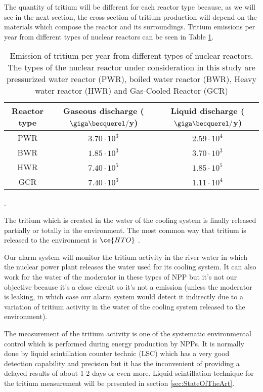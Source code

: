 The quantity of tritium will be different for each reactor type because, as we will see in the next section, the cross section of tritium production will depend on the materials which compose the reactor and its surroundings. Tritium emissions per year from different types of nuclear reactors can be seen in Table \ref{tab:TritiumEmisionsNPPs}. 

\begin{table}[htbp]
\begin{center}
\begin{tabular}{|c|c|c|}
\hline
Reactor type & Gaseous discharge ($\giga\becquerel/$y) & Liquid discharge ($\giga\becquerel/$y) \\
\hline \hline \hline
PWR & $3.70\cdot 10^{3}$ & $2.59\cdot 10^{4}$ \\ \hline
BWR & $1.85\cdot 10^{3}$ & $3.70\cdot 10^{3}$ \\ \hline
HWR & $7.40\cdot 10^{5}$ & $1.85\cdot 10^{5}$ \\ \hline
GCR & $7.40\cdot 10^{3}$ & $1.11\cdot 10^{4}$ \\ \hline
\end{tabular}
\caption{Emission of tritium per year from different types of nuclear reactors. The types of the nuclear reactor under consideration in this study are pressurized water reactor (PWR), boiled water reactor (BWR), Heavy water reactor (HWR) and Gas-Cooled Reactor (GCR) \cite{CommonEmissionTritium}}.
\label{tab:TritiumEmisionsNPPs}
\end{center}
\end{table} 

The tritium which is created in the water of the cooling system is finally released partially or totally in the environment. The most common way that tritium is released to the environment is $\ce{HTO}$ \cite{CommonEmissionTritium}.

Our alarm system will monitor the tritium activity in the river water in which the nuclear power plant releases the water used for its cooling system. It can also work for the water of the moderator in these types of NPP but it's not our objective because it's a close circuit so it's not a emission (unless the moderator is leaking, in which case our alarm system would detect it indirectly due to a variation of tritium activity in the water of the cooling system released to the environment).

The measurement of the tritium activity is one of the systematic environmental control which is performed during energy production by NPPs. It is normally done by liquid scintillation counter technic (LSC) which has a very good detection capability and precision but it has the inconvenient of providing a delayed results of about 1-2 days or even more. Liquid scintillation technique for the tritium measurement will be presented in section \ref{sec:StateOfTheArt}.

